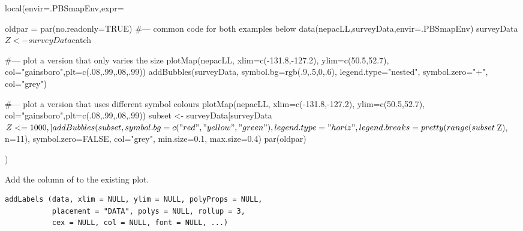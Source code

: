 \documentclass[letterpaper]{book}
\begin{document}
%
\begin{Examples}
\begin{ExampleCode}
local(envir=.PBSmapEnv,expr={
  oldpar = par(no.readonly=TRUE)
  #--- common code for both examples below
  data(nepacLL,surveyData,envir=.PBSmapEnv)
  surveyData$Z <- surveyData$catch

  #--- plot a version that only varies the size
  plotMap(nepacLL, xlim=c(-131.8,-127.2), ylim=c(50.5,52.7),
    col="gainsboro",plt=c(.08,.99,.08,.99))
  addBubbles(surveyData, symbol.bg=rgb(.9,.5,0,.6),
    legend.type="nested", symbol.zero="+", col="grey")

  #--- plot a version that uses different symbol colours
  plotMap(nepacLL, xlim=c(-131.8,-127.2), ylim=c(50.5,52.7),
  col="gainsboro",plt=c(.08,.99,.08,.99))
  subset <- surveyData[surveyData$Z <= 1000, ]
  addBubbles(subset, symbol.bg=c("red", "yellow", "green"),
    legend.type="horiz", legend.breaks=pretty(range(subset$Z), n=11),
    symbol.zero=FALSE, col="grey", min.size=0.1, max.size=0.4)
  par(oldpar)
})
\end{ExampleCode}
\end{Examples}
%
\begin{Description}\relax
Add the  column of  to the existing plot.
\end{Description}
%
\begin{Usage}
\begin{verbatim}
addLabels (data, xlim = NULL, ylim = NULL, polyProps = NULL,
           placement = "DATA", polys = NULL, rollup = 3,
           cex = NULL, col = NULL, font = NULL, ...)
\end{verbatim}
\end{Usage}
%
\end{document}
